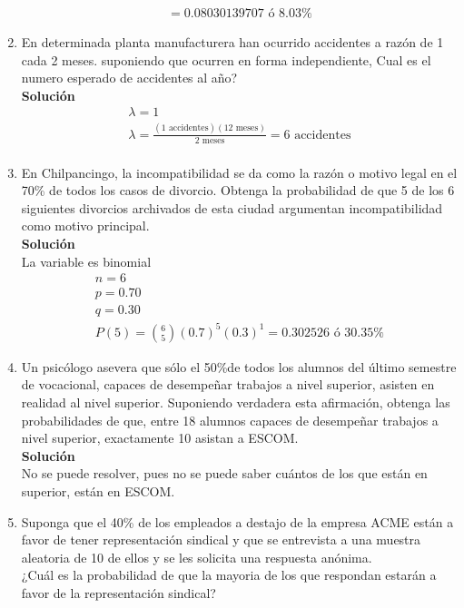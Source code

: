 \begin{enumerate}
\begin{gather*}
    = 0.08030139707 \text{ ó } 8.03\%
    \end{gather*}
    \item En determinada planta manufacturera han ocurrido accidentes a razón de 1 cada 2 meses. suponiendo que ocurren en forma independiente, Cual es el numero esperado de accidentes al año?
    \\\textbf{Solución}
    \\
    \begin{gather*}
    \lambda = 1 \tag{ cada 2 meses}\\
    \lambda = \frac{(1 \text{ accidentes})(12 \text{ meses})}{2 \text{ meses}} = 6 \text{ accidentes}\\
    \end{gather*}
    \item En Chilpancingo, la incompatibilidad se da como la razón o motivo legal en el 70\% de todos los casos de divorcio. Obtenga la probabilidad de que 5 de los 6 siguientes divorcios archivados de esta ciudad argumentan incompatibilidad como motivo principal.
    \\\textbf{Solución}
    \\La variable es binomial
    \begin{gather*}    
    n = 6\\
    p = 0.70 \\
    q = 0.30 \\
    P(5) = \binom{6}{5}(0.7)^5(0.3)^1 = 0.302526 \text{ ó }  30.35\%
    \end{gather*}
    \item Un psicólogo asevera que sólo el 50\%de todos los alumnos del último semestre de vocacional, capaces de desempeñar trabajos a nivel superior, asisten en realidad al nivel superior. Suponiendo verdadera esta afirmación, obtenga las probabilidades de que, entre 18 alumnos capaces de desempeñar trabajos a nivel superior, exactamente 10 asistan a ESCOM.
    \\\textbf{Solución}
    \\ No se puede resolver, pues no se puede saber cuántos de los que están en superior, están en ESCOM.
    \item Suponga que el 40\% de los empleados a destajo de la empresa ACME están a favor de tener representación sindical y que se entrevista a una muestra aleatoria de 10 de ellos y se les solicita una respuesta anónima.\\¿Cuál es la probabilidad de que la mayoria de los que respondan estarán a favor de la representación sindical?

\end{enumerate}

